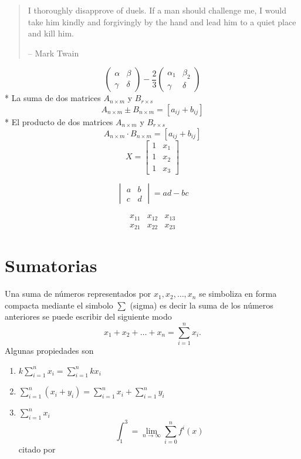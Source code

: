 \documentclass[10pt,]{krantz}
\providecommand{\tightlist}{%
  \setlength{\itemsep}{0pt}\setlength{\parskip}{0pt}}
\theoremstyle{definition}
\theoremstyle{definition}
\theoremstyle{definition}
\theoremstyle{remark}
\begin{document}
\begin{quote}
I thoroughly disapprove of duels. If a man should challenge me,
I would take him kindly and forgivingly by the hand and lead him
to a quiet place and kill him.

-- Mark Twain
\end{quote}

\[\begin{pmatrix}\alpha & \beta\\
\gamma & \delta
\end{pmatrix}-\frac{2}{3} \begin{pmatrix}\alpha_1 & \beta_2\\
\gamma & \delta
\end{pmatrix}\]
* La suma de dos matrices \(A_{n\times m}\) y \(B_{r\times s}\) \[A_{n\times m}\pm B_{n\times m}=[a_{ij}+b_{ij}]\]
* El producto de dos matrices \(A_{n\times m}\) y \(B_{r\times s}\) \[A_{n\times m}\cdot B_{n\times m}=[a_{ij}+b_{ij}]\]
\[X = \begin{bmatrix}1 & x_{1}\\
1 & x_{2}\\
1 & x_{3}
\end{bmatrix}\]

\[\begin{vmatrix}a & b\\
c & d
\end{vmatrix}=ad-bc\]

\[\begin{array}{ccc}
x_{11} & x_{12} & x_{13}\\
x_{21} & x_{22} & x_{23}
\end{array}\]

\hypertarget{appendix-apendice}{%
\appendix {}}


\hypertarget{sumatorias}{%
\chapter{Sumatorias}\label{sumatorias}}

Una suma de números representados por \(x_1, x_2, \ldots, x_n\) se simboliza en forma compacta mediante el simbolo \(\sum\) (sigma) es decir la suma de los números anteriores se puede escribir del siguiente modo \[x_1+x_2+\dots+x_n=\sum_{i=1}^nx_i.\]
Algunas propiedades son

\begin{enumerate}
\def\labelenumi{\arabic{enumi}.}
\tightlist
\item
  \(k\sum_{i=1}^nx_i=\sum_{i=1}^nkx_i\)
\item
  \(\sum_{i=1}^n\left(x_i+y_i\right)=\sum_{i=1}^nx_i+\sum_{i=1}^ny_i\)
\item
  \(\sum_{i=1}^nx_i\)
  \[\int_1^3=\lim_{n\to \infty}\sum_{i=0}^{n}f^i(x)\]
  citado por \citep{xie2015}
\end{enumerate}
\end{document}
